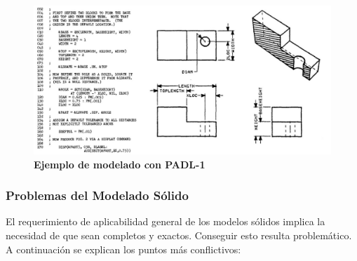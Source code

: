 \begin{figure}[h]
\includegraphics[width=16cm]{Img/GEO/geo-padl.jpg}
\centering
\caption{\textbf{\footnotesize{Ejemplo de modelado con PADL-1}}}
\end{figure}

\clearpage
\subsubsection{Problemas del Modelado Sólido }
\label{sectionproblema}

El requerimiento de aplicabilidad general de los modelos sólidos implica la necesidad de que sean completos y exactos. Conseguir esto resulta problemático.
A continuación se explican los puntos más conflictivos: 

